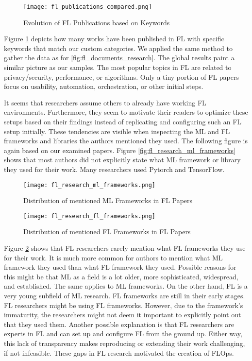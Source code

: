 \begin{figure}[h]
    \centering
    \texttt{[image: fl\_publications\_compared.png]}
    \caption{Evolution of FL Publications based on Keywords}
    \label{fig:fl_publications_compared}
\end{figure}
Figure \ref{fig:fl_publications_compared} depicts how many works have been published in FL with specific keywords that match our custom categories.
We applied the same method to gather the data as for \ref{fig:fl_documents_research}.
The global results paint a similar picture as our samples.
The most popular topics in FL are related to privacy/security, performance, or algorithms.
Only a tiny portion of FL papers focus on usability, automation, orchestration, or other initial steps.

It seems that researchers assume others to already have working FL environments.
Furthermore, they seem to motivate their readers to optimize these setups based on their findings instead of replicating and configuring such an FL setup initially.
These tendencies are visible when inspecting the ML and FL frameworks and libraries the authors mentioned they used.
The following figure is again based on our examined papers.
Figure \ref{fig:fl_research_ml_frameworks} shows that most authors did not explicitly state what ML framework or library they used for their work.
Many researchers used Pytorch and TensorFlow.
\begin{figure}[p]
    \centering
    \texttt{[image: fl\_research\_ml\_frameworks.png]}
    \caption{Distribution of mentioned ML Frameworks in FL Papers}
    \label{fig:fl_research_ml_frameworks}

    \texttt{[image: fl\_research\_fl\_frameworks.png]}
    \caption{Distribution of mentioned FL Frameworks in FL Papers}
    \label{fig:fl_research_fl_frameworks}
\end{figure}
Figure \ref{fig:fl_research_fl_frameworks} shows that FL researchers rarely mention what FL frameworks they use for their work.
It is much more common for authors to mention what ML framework they used than what FL framework they used.
Possible reasons for this might be that ML as a field is a lot older, more sophisticated, widespread, and established.
The same applies to ML frameworks.
On the other hand, FL is a very young subfield of ML research.
FL frameworks are still in their early stages.
FL researchers might be using FL frameworks.
However, due to the framework's immaturity, the researchers might not deem it important to explicitly point out that they used them.
Another possible explanation is that FL researchers are experts in FL and can set up and configure FL from the ground up.
Either way, this lack of transparency makes reproducing or extending their work challenging, if not infeasible.
These gaps in FL research motivated the creation of FLOps.
